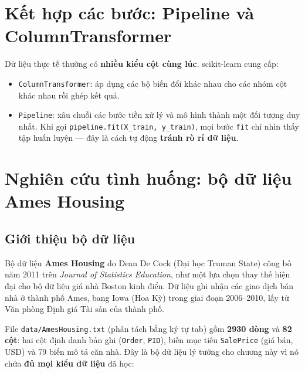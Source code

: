 \section{Kết hợp các bước: Pipeline và ColumnTransformer}

Dữ liệu thực tế thường có \textbf{nhiều kiểu cột cùng lúc}. scikit-learn cung cấp:
\begin{itemize}
    \item \texttt{ColumnTransformer}: áp dụng các bộ biến đổi khác nhau cho các nhóm cột khác nhau rồi ghép kết quả.
    \item \texttt{Pipeline}: xâu chuỗi các bước tiền xử lý và mô hình thành một đối tượng duy nhất. Khi gọi \texttt{pipeline.fit(X\_train, y\_train)}, mọi bước \texttt{fit} chỉ nhìn thấy tập huấn luyện --- đây là cách tự động \textbf{tránh rò rỉ dữ liệu}.
\end{itemize}


\section{Nghiên cứu tình huống: bộ dữ liệu Ames Housing}

\subsection{Giới thiệu bộ dữ liệu}

Bộ dữ liệu \textbf{Ames Housing} do Dean De Cock (Đại học Truman State) công bố năm 2011 trên \textit{Journal of Statistics Education}, như một lựa chọn thay thế hiện đại cho bộ dữ liệu giá nhà Boston kinh điển. Dữ liệu ghi nhận các giao dịch bán nhà ở thành phố Ames, bang Iowa (Hoa Kỳ) trong giai đoạn 2006--2010, lấy từ Văn phòng Định giá Tài sản của thành phố.

File \texttt{data/AmesHousing.txt} (phân tách bằng ký tự tab) gồm \textbf{2930 dòng} và \textbf{82 cột}: hai cột định danh bản ghi (\texttt{Order}, \texttt{PID}), biến mục tiêu \texttt{SalePrice} (giá bán, USD) và 79 biến mô tả căn nhà. Đây là bộ dữ liệu lý tưởng cho chương này vì nó chứa \textbf{đủ mọi kiểu dữ liệu} đã học:

